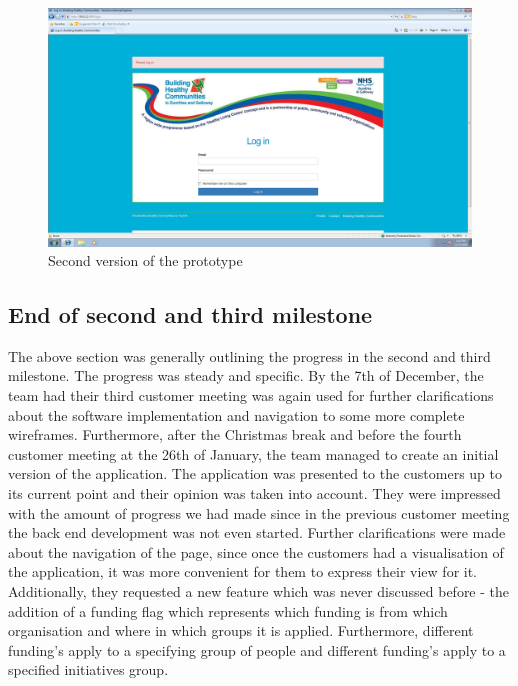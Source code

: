 \documentclass{l3proj}
\begin{document}
\begin{figure}
 \centerline{\includegraphics[width=\textwidth, height=\textheight, keepaspectratio]{newhome.png}}
 \caption{Second version of the prototype}
\end{figure}




\subsection{End of second and third milestone}
\label{sec:milestone23}

The above section was generally outlining the progress in the second and third milestone. The progress was steady and specific. By the 7th of December, the team had their third customer meeting was again used for further clarifications about the software implementation and navigation to some more complete wireframes. Furthermore, after the Christmas break and before the fourth customer meeting at the 26th of January, the team managed to create an initial version of the application. The application was presented to the customers up to its current point and their opinion was taken into account. They were impressed with the amount of progress we had made since in the previous customer meeting the back end development was not even started. Further clarifications were made about the navigation of the page, since once the customers had a visualisation of the application, it was more convenient for them to express their view for it. Additionally, they requested a new feature which was never discussed before - the addition of a funding flag which represents which funding is from which organisation and where in which groups it is applied. Furthermore, different funding's apply to a specifying group of people and different funding's apply to a specified initiatives group.
\end{document}
